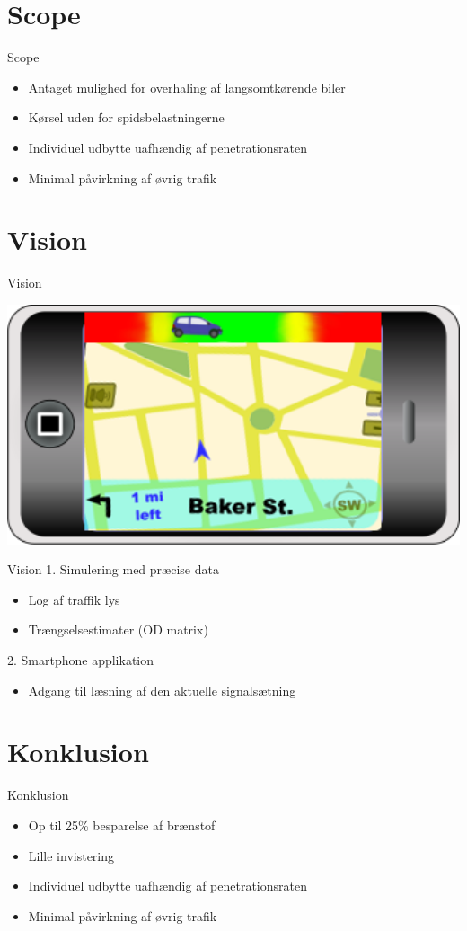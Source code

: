 \section{Scope}
\begin{frame}{Scope}
\begin{itemize}
\item Antaget mulighed for overhaling af langsomtkørende biler

\item Kørsel uden for spidsbelastningerne
\item Individuel udbytte uafhændig af penetrationsraten
\item Minimal påvirkning af øvrig trafik
\end{itemize}
\end{frame}

\section{Vision}
\begin{frame}{Vision}
\begin{center}
\includegraphics[width=1\textwidth]{images/product.png}
\end{center}
\end{frame}

\begin{frame}{Vision}
1. Simulering med præcise data
	\begin{itemize}
	\item Log af traffik lys
	\item Trængselsestimater (OD matrix)
	\end{itemize}

2. Smartphone applikation
	\begin{itemize}
	\item Adgang til læsning af den aktuelle signalsætning
	\end{itemize}

\end{frame}

\section{Konklusion}
\begin{frame}{Konklusion}

\begin{itemize}
\item Op til 25\% besparelse af brænstof
\item Lille invistering
\item Individuel udbytte uafhændig af penetrationsraten
\item Minimal påvirkning af øvrig trafik
\end{itemize}
\end{frame}
